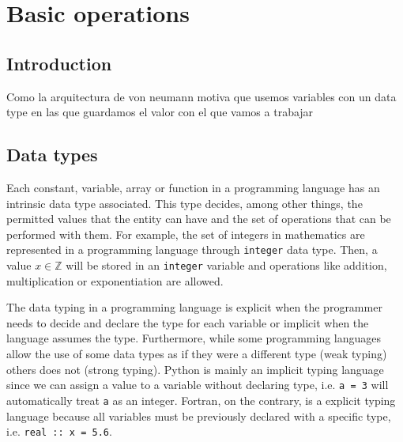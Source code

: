 \chapter{Basic operations} \label{chap:basicop}


    \section{Introduction} 

Como la arquitectura de von neumann motiva que usemos variables con un data type en las que guardamos el valor con el que vamos a trabajar



\section{Data types} 



Each constant, variable, array or function in a programming language has an intrinsic data type associated. 
This type decides, among other things, the permitted values that the entity can have and the set of operations that can be performed with them.
For example, the set of integers in mathematics are represented in a programming language through \texttt{integer} data type. 
Then, a value $x\in \mathbb{Z}$ will be stored in an \texttt{integer} variable and operations like addition, multiplication or exponentiation are allowed. 

The data typing in a programming language is explicit when the programmer needs to decide and declare the type for each variable or implicit when the language assumes the type. 
Furthermore, while some programming languages allow the use of some data types as if they were a different type (weak typing) others does not (strong typing). 
Python is mainly an implicit typing language since we can assign a value to a variable without declaring type, i.e. \texttt{a = 3} will automatically treat \texttt{a} as an integer. 
Fortran, on the contrary, is a explicit typing language because all variables must be previously declared with a specific type, i.e. \texttt{real :: x = 5.6}.




